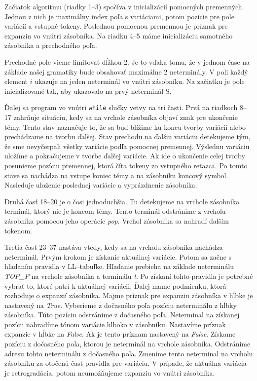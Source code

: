 Začiatok algoritmu (riadky 1--3) spočíva v inicializácií pomocných premenných. Jednou z nich je maximálny index poľa s variáciami, potom pozície pre pole variácií a vstupné tokeny. Poslednou pomocnou premennou je príznak pre expanziu vo vnútri zásobníka. Na riadku 4--5 máme inicializáciu samotného zásobnika a prechodného poľa.

Prechodné pole vieme limitovať dĺžkou 2. Je to vďaka tomu, že v jednom čase na základe našej gramatiky bude obsahovať maximálne 2 neterminály. V poli každý element $i$ ukazuje na jeden neterminál vo vnútri zásobníku. Na začiatku je pole inicializované tak, aby ukazovalo na prvý neterminál S.

Ďalej sa program vo vnútri \texttt{while} slučky vetvy na tri časti. Prvá na riadkoch 8--17 zahrňuje situáciu, kedy sa na vrchole zásobníka objaví znak pre ukončenie témy. Tento stav naznačuje to, že sa buď blížime ku koncu tvorby variácií alebo prechádzame na tvorbu ďalšej. Stav prechodu na ďalšiu variáciu detekujeme tým, že sme nevyčerpali všetky variácie podľa pomocnej premennej. Výslednu variáciu uložíme a pokračujeme  v tvorbe ďalšej variácie. Ak ide o ukončenie celej tvorby posunieme pozíciu premennej, ktorá číta tokeny zo vstupného reťazca. Po tomto stave sa nachádza na vstupe koniec témy a na zásobníku koncový symbol. Nasleduje uloženie poslednej variácie a vyprázdnenie zásobníka.

Druhá časť 18--20 je o čosi jednoduchšia. Tu detekujeme na vrchole zásobníka terminál, ktorý nie je koncom témy. Tento terminál odstránime z vrcholu zásobníka pomocou jeho operácie \textit{pop}. Vrchol zásobnika sa nahradí ďalším tokenom.

Tretia časť 23--37 nastáva vtedy, kedy sa na vrcholu zásobníka nachádza neterminál. Prvým krokom je získanie aktuálnej variácie. Potom sa začne s hľadaním pravidla v LL--tabuľke. Hľadanie prebieha na základe neterminálu \textit{TOP\_P} na vrchole zásobníka a terminálu \textit{t}. Po získaní tohto pravidla je potrebné vybrať to, ktoré patrí k aktuálnej variácii. Ďalej mame podmienku, ktorá rozhoduje o expanzií zásobníka. Majme príznak pre expanziu zásobníka v hĺbke je nastavený na \textit{True}. Vyberieme z dočasného poľa pozíciu neterminálu z hĺbky zásobníka. Túto pozíciu odstránime z dočasného poľa. Neterminal na získanej pozícii nahradíme tónom variácie hlboko v zásobníku. Nastavíme príznak expanzie v hĺbke na \textit{False}. Ak je tento príznam nastavený na \textit{False}. Získame pozíciu z dočasného poľa, ktorou je neterminál na vrchole zásobníka. Odstránime adresu tohto neterminálu z dočasného poľa. Zmeníme tento neterminal na vrcholu zásobníku za otočenú časť pravidla pre variáciu. V prípade, že aktuálna variácia je retrogradácia, potom neumožňujeme expanziu vo vnútri zásobníka.

